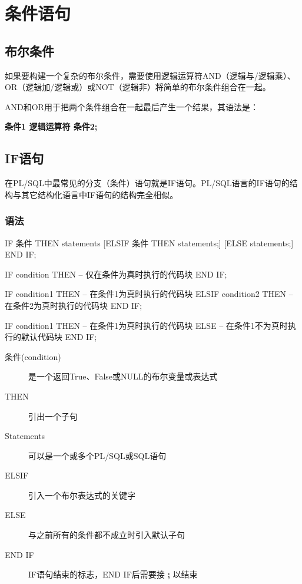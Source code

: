 \documentclass[11pt, a4paper, oneside, UTF8]{ctexbook}
\let\kaishu\relax %
\begin{document}
\chapter{条件语句}
\section{布尔条件}
如果要构建一个复杂的布尔条件，需要使用逻辑运算符AND（逻辑与/逻辑乘）、OR（逻辑加/逻辑或）或NOT（逻辑非）将简单的布尔条件组合在一起。

AND和OR用于把两个条件组合在一起最后产生一个结果，其语法是：

{\bfseries\kaishu 条件1 逻辑运算符 条件2;}

\section{IF语句}
在PL/SQL中最常见的分支（条件）语句就是IF语句。PL/SQL语言的IF语句的结构与其它结构化语言中IF语句的结构完全相似。

\subsection{语法}
\begin{plsql}[caption=IF语法]
IF 条件 THEN
  statements
[ELSIF 条件 THEN
  statements;]
[ELSE
  statements;]
END IF;
\end{plsql}

\begin{plsql}[caption=IF语法示例1]
IF condition THEN
  -- 仅在条件为真时执行的代码块
END IF;

IF condition1 THEN
  -- 在条件1为真时执行的代码块
ELSIF condition2 THEN
  -- 在条件2为真时执行的代码块
END IF;

IF condition1 THEN
  -- 在条件1为真时执行的代码块
ELSE
  -- 在条件1不为真时执行的默认代码块
END IF;
\end{plsql}

\begin{description}
  \item[条件(condition)] 是一个返回True、False或NULL的布尔变量或表达式
  \item[THEN] 引出一个子句
  \item[Statements] 可以是一个或多个PL/SQL或SQL语句
  \item[ELSIF] 引入一个布尔表达式的关键字
  \item[ELSE] 与之前所有的条件都不成立时引入默认子句
  \item[END IF] IF语句结束的标志，END IF后需要接 \textbf{;} 以结束
\end{description}
\end{document}

